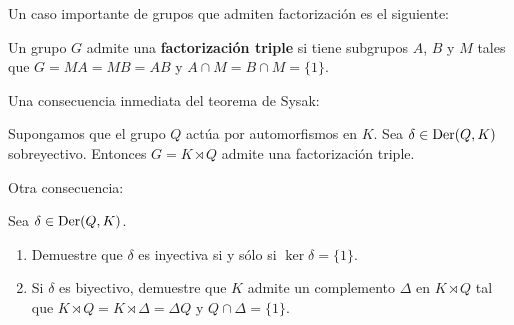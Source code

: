 Un caso importante de grupos que admiten factorización
es el siguiente: 

\begin{definition}
	Un grupo $G$ admite una \textbf{factorización triple} si tiene subgrupos
	$A$, $B$ y $M$ tales que $G=MA=MB=AB$ y $A\cap M=B\cap M=\{1\}$.
\end{definition}


Una consecuencia inmediata del teorema de Sysak:

\begin{corollary}
	Supongamos que el grupo $Q$ actúa por automorfismos en $K$. Sea
	$\delta\in\operatorname{Der}(Q,K)$ sobreyectivo. Entonces $G=K\rtimes Q$ admite una
	factorización triple.
\end{corollary}

Otra consecuencia: 

\begin{exercise}
	\label{xca:ker1cocycle}
	Sea $\delta\in\operatorname{Der}(Q,K)$. 
	\begin{enumerate}
	\item Demuestre que $\delta$ es inyectiva si y sólo si
	$\ker\delta=\{1\}$.
	\item Si $\delta$ es biyectivo, demuestre que 
	$K$ admite un complemento
	$\Delta$ en $K\rtimes Q$ tal que $K\rtimes Q=K\rtimes\Delta=\Delta Q$ y
	$Q\cap\Delta=\{1\}$.
	\end{enumerate}
\end{exercise}



